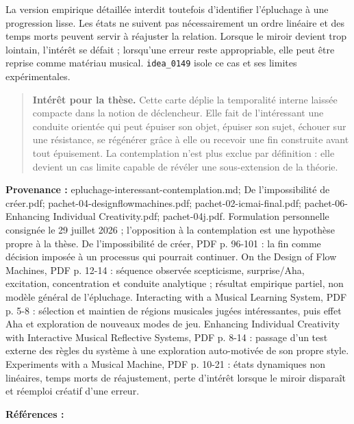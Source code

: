 \documentclass[10pt,a4paper]{article}
\begin{document}
La version empirique détaillée interdit toutefois d'identifier l'épluchage à une progression lisse. Les états ne suivent pas nécessairement un ordre linéaire et des temps morts peuvent servir à réajuster la relation. Lorsque le miroir devient trop lointain, l'intérêt se défait ; lorsqu'une erreur reste appropriable, elle peut être reprise comme matériau musical. \texttt{idea\_0149} isole ce cas et ses limites expérimentales.

\begin{quote}
\textbf{Intérêt pour la thèse.} Cette carte déplie la temporalité interne laissée compacte dans la notion de déclencheur. Elle fait de l'intéressant une conduite orientée qui peut épuiser son objet, épuiser son sujet, échouer sur une résistance, se régénérer grâce à elle ou recevoir une fin construite avant tout épuisement. La contemplation n'est plus exclue par définition : elle devient un cas limite capable de révéler une sous-extension de la théorie.
\end{quote}
{\footnotesize\color{metadata}\textbf{Provenance :} epluchage-interessant-contemplation.md; De l'impossibilité de créer.pdf; pachet-04-designflowmachines.pdf; pachet-02-icmai-final.pdf; pachet-06-Enhancing Individual Creativity.pdf; pachet-04j.pdf. Formulation personnelle consignée le 29 juillet 2026 ; l'opposition à la contemplation est une hypothèse propre à la thèse. De l'impossibilité de créer, PDF p. 96-101 : la fin comme décision imposée à un processus qui pourrait continuer. On the Design of Flow Machines, PDF p. 12-14 : séquence observée scepticisme, surprise/Aha, excitation, concentration et conduite analytique ; résultat empirique partiel, non modèle général de l'épluchage. Interacting with a Musical Learning System, PDF p. 5-8 : sélection et maintien de régions musicales jugées intéressantes, puis effet Aha et exploration de nouveaux modes de jeu. Enhancing Individual Creativity with Interactive Musical Reflective Systems, PDF p. 8-14 : passage d'un test externe des règles du système à une exploration auto-motivée de son propre style. Experiments with a Musical Machine, PDF p. 10-21 : états dynamiques non linéaires, temps morts de réajustement, perte d'intérêt lorsque le miroir disparaît et réemploi créatif d'une erreur.\par}
{\footnotesize\color{metadata}\textbf{Références :} \parencite{pachet2026impossibilite,pachet2004flowmachines,pachet2002continuatorinteraction,pachet2006reflective,addessi2005experiments}\par}
\end{document}
